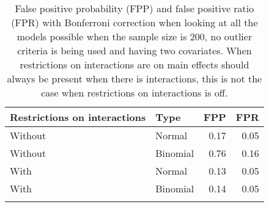 \begin{longtable}{llrr}
\caption{False positive probability (FPP) and false positive ratio (FPR) with Bonferroni correction when looking at all the models possible when the sample size is 200, no outlier criteria is being used and having two covariates. When restrictions on interactions are on main effects should always be present when there is interactions, this is not the case when restrictions on interactions is off.} \\ 
  \hline
Restrictions on interactions & Type & FPP & FPR \\ 
  \hline
Without & Normal & 0.17 & 0.05 \\ 
  Without & Binomial & 0.76 & 0.16 \\ 
  With & Normal & 0.13 & 0.05 \\ 
  With & Binomial & 0.14 & 0.05 \\ 
   \hline
\hline
\label{tab:resultFullBC}
\end{longtable}

